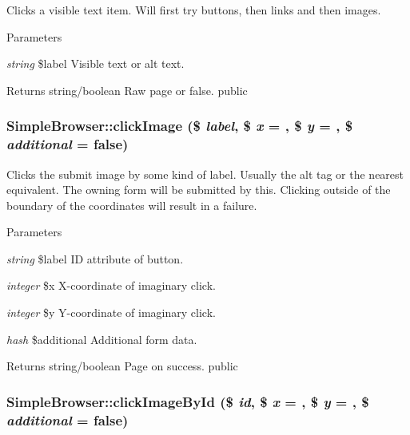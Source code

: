 Clicks a visible text item. Will first try buttons, then links and then images. 
\begin{DoxyParams}{Parameters}
\item[{\em string}]\$label Visible text or alt text. \end{DoxyParams}
\begin{DoxyReturn}{Returns}
string/boolean Raw page or false.  public 
\end{DoxyReturn}
\hypertarget{class_simple_browser_a03c5895361643a7b1e9a976e7c2fad2b}{
\subsubsection[{clickImage}]{\setlength{\rightskip}{0pt plus 5cm}SimpleBrowser::clickImage (\$ {\em label}, \/  \$ {\em x} = {}, \/  \$ {\em y} = {}, \/  \$ {\em additional} = {\ttfamily false})}}
\label{class_simple_browser_a03c5895361643a7b1e9a976e7c2fad2b}
Clicks the submit image by some kind of label. Usually the alt tag or the nearest equivalent. The owning form will be submitted by this. Clicking outside of the boundary of the coordinates will result in a failure. 
\begin{DoxyParams}{Parameters}
\item[{\em string}]\$label ID attribute of button. \item[{\em integer}]\$x X-\/coordinate of imaginary click. \item[{\em integer}]\$y Y-\/coordinate of imaginary click. \item[{\em hash}]\$additional Additional form data. \end{DoxyParams}
\begin{DoxyReturn}{Returns}
string/boolean Page on success.  public 
\end{DoxyReturn}
\hypertarget{class_simple_browser_a0750dd5719a6bcc3e6bcbb7f52fbc92b}{
\subsubsection[{clickImageById}]{\setlength{\rightskip}{0pt plus 5cm}SimpleBrowser::clickImageById (\$ {\em id}, \/  \$ {\em x} = {}, \/  \$ {\em y} = {}, \/  \$ {\em additional} = {\ttfamily false})}}
\label{class_simple_browser_a0750dd5719a6bcc3e6bcbb7f52fbc92b}
